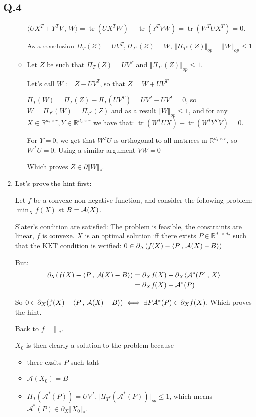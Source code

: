 \documentclass[12pt]{article}
\newcommand{\Q}[1]{\subsection*{Q.#1}}
\newenvironment{question}[1]
{\Q{#1}}{}
\newcommand{\nucnorm}[1]{\Vert #1 \Vert_*}
\newcommand{\opnorm}[1]{\Vert #1 \Vert_{op}}
\newcommand{\inner}[2]{\langle #1 \, , \, #2 \rangle}
\DeclareMathOperator{\tr}{tr}
\begin{document}
\begin{question}{4}
\begin{enumerate}
\begin{itemize}
      $\inner{UX^T + Y^TV}{W} = \tr(UX^TW) + \tr(Y^TVW) = \tr(W^TUX^T) = 0$.
      
      As a conclusion $\Pi_T(Z) = UV^T, \Pi_{T^c}(Z) = W$, $\opnorm{\Pi_{T^c}(Z)} = \opnorm{W} \le 1$
    \item Let $Z$ be such that $\Pi_T(Z) = UV^T$ and $\opnorm{\Pi_{T^c}(Z)} \le 1$.

      Let's call $W := Z - UV^T$, so that $Z = W + UV^T$
      
      $\Pi_T(W) = \Pi_T(Z) - \Pi_T(UV^T) = UV^T - UV^T = 0$, so $W = \Pi_{T^c}(W) = \Pi_{T^c}(Z)$ and as a result $\opnorm{W} \le 1$, and for any $X \in \mathbb R^{d_2 \times r}, Y \in \mathbb R^{d_2 \times r}$ we have that: $\tr(W^TUX) + \tr(W^TY^TV) = 0$.

      For $Y = 0$, we get that $W^TU$ is orthogonal to all matrices in $\mathbb R^{d_2 \times r}$, so $W^TU = 0$. Using a similar argument $VW = 0$
      
      Which proves $Z \in \partial \nucnorm{W}$.
      
    \end{itemize}
  \item[4.6]

      
    Let's prove the hint first:
    
    Let $f$ be a convexe non-negative function, and consider the following problem:
    $\min_X f(X)$ st $B = {\cal A}(X)$.
    
    Slater's condition are satisfied: The problem is feasible, the constraints are linear,  $f$ is convexe. $X$ is an optimal solution iff there exists $P \in \mathbb R^{d_1 \times d_2}$ such that the KKT condition is verified:  $0 \in \partial_X( f(X) - \inner{P}{{\cal A}(X) - B})$
    
    But:
    \begin{align*}
      \partial_X( f(X) - \inner{P}{{\mathcal A}(X) - B})
      &= \partial_X f(X) - \partial_X \inner{\mathcal A^*(P)}{X}
      \\&=  \partial_X f(X) - {\cal A}^*(P)
    \end{align*}
    
    So  $0 \in \partial_X( f(X) - \inner{P}{{\cal A}(X) - B}) \iff \exists P \mathcal A^*(P) \in \partial_X f(X)$. Which proves the hint.

    
    Back to $f = \nucnorm{}$.
    
    $X_0$ is then clearly a solution to the problem because
    \begin{itemize}
    \item there exsits $P$ such taht
    \item $\mathcal A(X_0) = B$
    \item $\Pi_T(\mathcal A^*(P)) = UV^T, \opnorm{\Pi_{T^c}(\mathcal
        A^*(P))} \le 1$, which means $\mathcal A^*(P) \in \partial_X \nucnorm{X_0}$.
    \end{itemize}



\end{enumerate}
\end{question}
\end{document}
